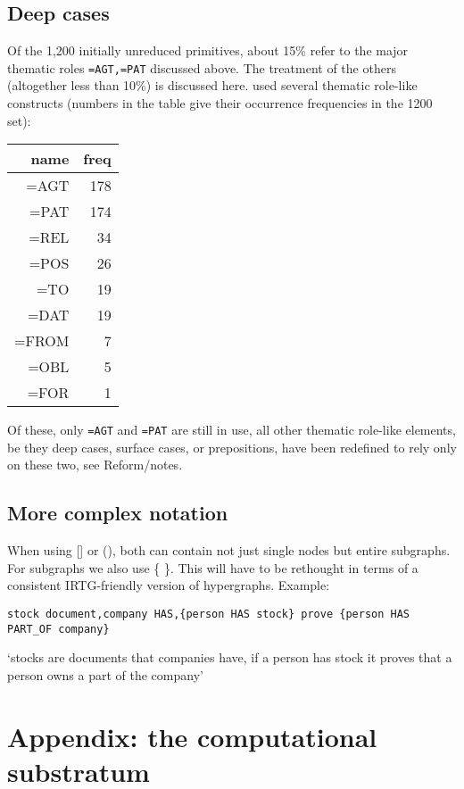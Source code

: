 \documentclass[11pt,bookmarks,bookmarksnumbered,naturalnames,plainpages=false,pdftex,colorlinks=true,urlcolor=blue,bookmarksdepth=subsection,plainpages=false]{paper}
\begin{document}
\subsection{Deep cases}\label{deepcase}

Of the 1,200 initially unreduced primitives, about 15\% refer to the major
thematic roles {\tt =AGT,=PAT} discussed above. The treatment of the others
(altogether less than 10\%) is discussed here. \cite{Makrai:2014} used several 
thematic role-like constructs (numbers in the table give their occurrence
frequencies in the 1200 set):

\begin{tabular}{rr}
name & freq\\
\hline
=AGT & 178\\
=PAT & 174\\
=REL & 34\\
=POS & 26\\
=TO & 19\\
=DAT & 19\\
=FROM & 7\\
=OBL & 5\\
=FOR & 1\\
\end{tabular}

Of these, only {\tt =AGT} and {\tt =PAT} are still in use, all other thematic
role-like elements, be they deep cases, surface cases, or prepositions, have
been redefined to rely only on these two, see Reform/notes.

\subsection{More complex notation}\label{parens}

When using [] or (), both can contain not just single nodes but entire
subgraphs. For subgraphs we also use \{ \}. This will have to be rethought in
terms of a consistent IRTG-friendly version of hypergraphs. Example:

\begin{verbatim}
stock document,company HAS,{person HAS stock} prove {person HAS PART_OF company}
\end{verbatim}

\noindent
`stocks are documents that companies have, if a person has stock it proves
that a person owns a part of the company'


\section*{Appendix: the computational substratum}
\end{document}
